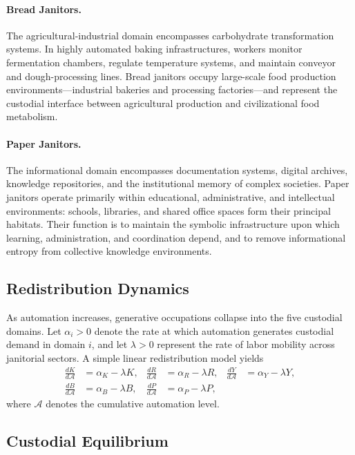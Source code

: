 \documentclass[12pt,a4paper]{article}
\theoremstyle{plain}
\theoremstyle{definition}
\theoremstyle{remark}
\begin{document}
\paragraph{Bread Janitors.}
The agricultural-industrial domain encompasses carbohydrate transformation
systems.  In highly automated baking infrastructures, workers monitor
fermentation chambers, regulate temperature systems, and maintain conveyor
and dough-processing lines.  Bread janitors occupy large-scale food
production environments---industrial bakeries and processing factories---and
represent the custodial interface between agricultural production and
civilizational food metabolism.

\paragraph{Paper Janitors.}
The informational domain encompasses documentation systems, digital archives,
knowledge repositories, and the institutional memory of complex societies.
Paper janitors operate primarily within educational, administrative, and
intellectual environments: schools, libraries, and shared office spaces form
their principal habitats.  Their function is to maintain the symbolic
infrastructure upon which learning, administration, and coordination depend,
and to remove informational entropy from collective knowledge environments.

\subsection{Redistribution Dynamics}

As automation increases, generative occupations collapse into the five
custodial domains.  Let $\alpha_i > 0$ denote the rate at which automation
generates custodial demand in domain $i$, and let $\lambda > 0$ represent
the rate of labor mobility across janitorial sectors.  A simple linear
redistribution model yields
\begin{align*}
\frac{dK}{d\mathcal{A}} &= \alpha_K - \lambda K, &
\frac{dR}{d\mathcal{A}} &= \alpha_R - \lambda R, &
\frac{dY}{d\mathcal{A}} &= \alpha_Y - \lambda Y, \\[4pt]
\frac{dB}{d\mathcal{A}} &= \alpha_B - \lambda B, &
\frac{dP}{d\mathcal{A}} &= \alpha_P - \lambda P,
\end{align*}
where $\mathcal{A}$ denotes the cumulative automation level.

\subsection{Custodial Equilibrium}
\end{document}
